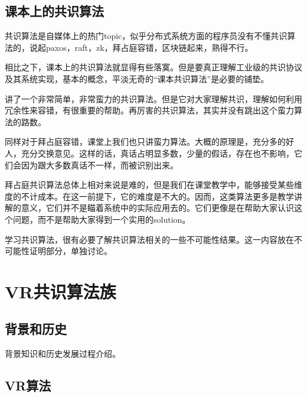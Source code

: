 \documentclass[UTF8]{ctexrep}
\begin{document}
\section{课本上的共识算法}

共识算法是自媒体上的热门topic，似乎分布式系统方面的程序员没有不懂共识算法的，说起paxos，raft，zk，拜占庭容错，区块链起来，熟得不行。

相比之下，课本上的共识算法就显得有些落寞。但是要真正理解工业级的共识协议及其系统实现，基本的概念，平淡无奇的“课本共识算法”是必要的铺垫。

\cite[Sec 5.1.3]{Attiya04}讲了一个非常简单，非常蛮力的共识算法。但是它对大家理解共识，理解如何利用冗余性来容错，有很重要的帮助。再厉害的共识算法，其实并没有跳出这个蛮力算法的路数。

同样对于拜占庭容错，课堂上我们也只讲蛮力算法\cite[Sec 5.2.4, Sec 5.2.5]{Attiya04}。大概的原理是，充分多的好人，充分交换意见。这样的话，真话占明显多数，少量的假话，存在也不影响，它们会因为跟大多数真话不一样，而被识别出来。

拜占庭共识算法总体上相对来说是难的，但是我们在课堂教学中，能够接受某些维度的不计成本。在这一前提下，它的难度是不大的。因而，这类算法更多是教学讲解的意义，它们并不是瞄着系统中的实际应用去的。它们更像是在帮助大家认识这个问题，而不是帮助大家得到一个实用的solution。

学习共识算法，很有必要了解共识算法相关的一些不可能性结果。这一内容放在不可能性证明部分，单独讨论。




\chapter{VR共识算法族}

\section{背景和历史}

背景知识和历史发展过程介绍\cite[Chap 7]{Charron10}。

\section{VR算法}

\end{document}
